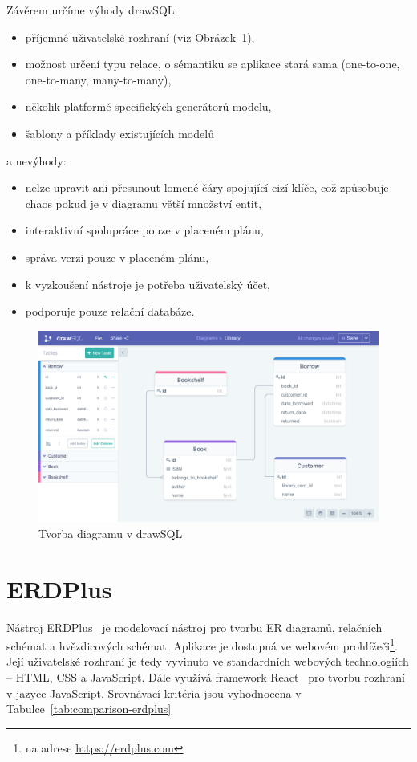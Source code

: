 Závěrem určíme výhody drawSQL:
\begin{itemize}
  \item příjemné uživatelské rozhraní (viz Obrázek~\ref{fig:drawsql}),
  \item možnost určení typu relace, o sémantiku se aplikace stará sama (one-to-one, one-to-many, many-to-many),
  \item několik platformě specifických generátorů modelu,
  \item šablony a příklady existujících modelů
\end{itemize}
a nevýhody:
\begin{itemize}
  \item nelze upravit ani přesunout lomené čáry spojující cizí klíče, což způsobuje chaos pokud je v diagramu větší množství entit,
  \item interaktivní spolupráce pouze v placeném plánu,
  \item správa verzí pouze v placeném plánu,
  \item k vyzkoušení nástroje je potřeba uživatelský účet,
  \item podporuje pouze relační databáze.
\end{itemize}

\begin{figure}[!htb]
  \centering
  \includegraphics[width = \maxwidth{\textwidth}]{../img/drawsql.png}
  \caption{Tvorba diagramu v drawSQL}
  \label{fig:drawsql}
\end{figure}

\section{ERDPlus}

Nástroj ERDPlus~\cite{erdplus_2023} je modelovací nástroj pro tvorbu ER diagramů, relačních schémat a hvězdicových schémat.
Aplikace je dostupná ve webovém prohlížeči\footnote{na adrese \url{https://erdplus.com}}.
Její uživatelské rozhraní je tedy vyvinuto ve standardních webových technologiích -- HTML, CSS a JavaScript.
Dále využívá framework React~\cite{react_2023} pro tvorbu rozhraní v jazyce JavaScript.
Srovnávací kritéria jsou vyhodnocena v Tabulce~\ref{tab:comparison-erdplus}

